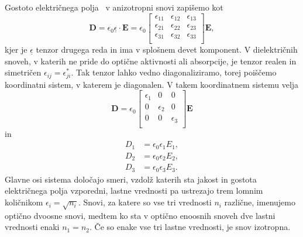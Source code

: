 Gostoto električnega polja~ v anizotropni snovi zapišemo kot 
\begin{equation}
\mathbf{D}=\epsilon_{0}\underline{\epsilon} \cdot\mathbf{E} = 
\epsilon_{0}
\left[\begin{array}{ccc}
\epsilon_{11} & \epsilon_{12}& \epsilon_{13}\\
\epsilon_{21} & \epsilon_{22}& \epsilon_{23}\\
\epsilon_{31} & \epsilon_{32}& \epsilon_{33}\\
\end{array}\right]\mathbf{E},
\label{eq:gostota-elektricnega-polja-tenzor}
\end{equation}
kjer je $\underline{\epsilon}$ tenzor drugega reda in ima v splošnem devet komponent.
V dielektričnih snoveh, v katerih ne pride do optične aktivnosti ali absorpcije, je tenzor
realen in simetričen $\epsilon_{ij}=\epsilon_{ji}^*$. Tak tenzor lahko vedno
diagonaliziramo, torej poiščemo koordinatni sistem, v katerem je 
diagonalen. V takem koordinatnem sistemu velja 
\begin{equation}
\mathbf{D} = \epsilon_{0}
\left[\begin{array}{ccc}
\epsilon_{1} & 0& 0\\
0 & \epsilon_{2}& 0\\
0 & 0& \epsilon_{3}\\
\end{array}\right]\mathbf{E}
\end{equation}
in 
\begin{align}
D_{1}&=\epsilon_{0}\epsilon_{1}E_{1},\nonumber \\
D_{2}&=\epsilon_{0}\epsilon_{2}E_{2},\nonumber \\
D_{3}&=\epsilon_{0}\epsilon_{3}E_{3}.\label{eq:gostota-elektricnega-polja-lastni}
\end{align}
Glavne osi sistema določajo smeri, vzdolž katerih sta jakost
in gostota električnega polja vzporedni, lastne vrednosti 
pa ustrezajo trem lomnim količnikom $\epsilon_{i}=\sqrt{n_{i}}$. Snovi,
za katere so vse tri vrednosti $n_i$ različne, imenujemo optično dvoosne snovi, 
medtem ko sta v optično enoosnih snoveh dve lastni vrednosti enaki $n_{1}=n_{2}$. 
Če so enake vse tri lastne vrednosti, je snov izotropna.

